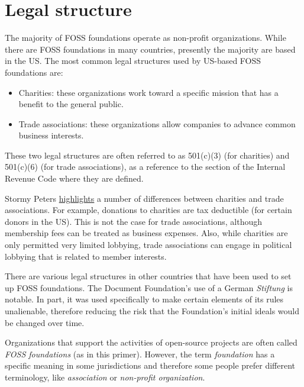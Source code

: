 


\chapter{Legal structure}

The majority of FOSS foundations operate as non-profit organizations.  While there are FOSS foundations in many countries, presently the majority are based in the US.  The most common legal structures used by US-based FOSS foundations are:

\begin{itemize}

\itemsep 0.50em

\item Charities: these organizations work toward a specific mission that has a benefit to the general public.

\item Trade associations: these organizations allow companies to advance common business interests.

\end {itemize}

These two legal structures are often referred to as 501(c)(3) (for charities) and 501(c)(6) (for trade associations), as a reference to the section of the Internal Revenue Code where they are defined.

Stormy Peters \href{http://stormyscorner.com/2008/08/501c-3-versus-6.html}{highlights} a number of differences between charities and trade associations.  For example, donations to charities are tax deductible (for certain donors in the US).  This is not the case for trade associations, although membership fees can be treated as business expenses.  Also, while charities are only permitted very limited lobbying, trade associations can engage in political lobbying that is related to member interests.

There are various legal structures in other countries that have been used to set up FOSS foundations.  The Document Foundation's use of a German \textit{Stiftung} is notable.  In part, it was used specifically to make certain elements of its rules unalienable, therefore reducing the risk that the Foundation's initial ideals would be changed over time.

\begin{kaobox}[frametitle=FOSS foundations: what's in a name?]

Organizations that support the activities of open-source projects are often called \textit{FOSS foundations} (as in this primer).  However, the term \textit{foundation} has a specific meaning in some jurisdictions and therefore some people prefer different terminology, like \textit{association} or \textit{non-profit organization}.

\end{kaobox}


